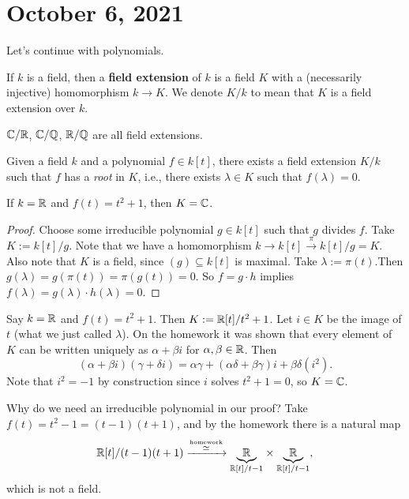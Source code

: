 \section{October 6, 2021} 
Let's continue with polynomials.
\begin{definition}[]
    If $k$ is a field, then a \textbf{field extension} of $k$ is a field $K$ with a (necessarily injective) homomorphism $k \to K$. We denote $K / k$ to mean that $K$ is a field extension over $k$.
\end{definition}
\begin{example}
    $\mathbb{C} /\mathbb{R}$, $\mathbb{C} /\mathbb{Q}$, $\mathbb{R} / \mathbb{Q}$ are all field extensions.
\end{example}
\begin{claim}
    Given a field $k$ and a polynomial $f \in k[t]$, there exists a field extension $K / k$ such that $f$ has a \emph{root} in $K$, i.e., there exists $\lambda \in K$ such that $f(\lambda)=0$.
\end{claim}
\begin{example}
    If $k=\mathbb{R}$ and $f(t)=t^2+1$, then $K=\mathbb{C}$.
\end{example}
\begin{proof}
    Choose some irreducible polynomial $g \in k[t]$ such that $g$ divides $f$.  Take $K:= k[t] /g$. Note that we have a homomorphism $k \to  k[t] \xrightarrow{\pi}  k[t] / g=K$. Also note that $K$ is a field, since $(g) \subseteq k[t]$ is maximal. Take $\lambda:= \pi(t)$.Then $g(\lambda)=g(\pi(t))=\pi(g(t))=0$. So $f=g\cdot h$ implies $f(\lambda)=g(\lambda)\cdot h(\lambda)=0$.
\end{proof}
\begin{example}
    Say $k=\mathbb{R}$ and $f(t)=t^2+1$. Then $K:= \mathbb{R} [t] / t^2+1$. Let $i \in K$ be the image of $t$ (what we just called $\lambda$). On the homework it was shown that every element of $K$ can be written uniquely as $\alpha +\beta i$ for $\alpha ,\beta  \in \mathbb{R}$. Then \[
        (\alpha +\beta  i)(\gamma +\delta i)=\alpha \gamma +(\alpha \delta +\beta \gamma )i+\beta \delta (i^2).
    \] Note that $i^2=-1$ by construction since $i$ solves $t^2+1=0$, so $K=\mathbb{C}$.
\end{example}
\begin{example}
    Why do we need an irreducible polynomial in our proof? Take $f(t)= t^2-1=(t-1)(t+1)$, and by the homework there is a natural map \[
        \mathbb{R}[t] / (t-1)(t+1) \xrightarrow{\overset{\text{homework}}{\simeq}} \underset{\mathbb{R}[t] / t-1}{\underbrace{\mathbb{R}}} \times  \underset{\mathbb{R}[t] / t-1}{\underbrace{\mathbb{R}}} ,
    \] which is not a field.
\end{example}
